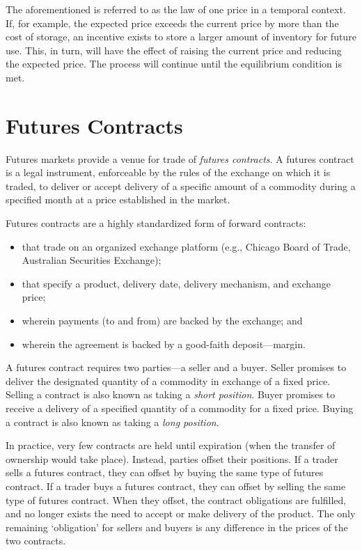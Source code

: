 \documentclass[
  oneside]{book}
\providecommand{\tightlist}{%
  \setlength{\itemsep}{0pt}\setlength{\parskip}{0pt}}
\begin{document}
The aforementioned is referred to as the law of one price in a temporal context. If, for example, the expected price exceeds the current price by more than the cost of storage, an incentive exists to store a larger amount of inventory for future use. This, in turn, will have the effect of raising the current price and reducing the expected price. The process will continue until the equilibrium condition is met.

\hypertarget{futures-contracts}{%
\section{Futures Contracts}\label{futures-contracts}}

Futures markets provide a venue for trade of \emph{futures contracts}. A futures contract is a legal instrument, enforceable by the rules of the exchange on which it is traded, to deliver or accept delivery of a specific amount of a commodity during a specified month at a price established in the market.

Futures contracts are a highly standardized form of forward contracts:

\begin{itemize}
\tightlist
\item
  that trade on an organized exchange platform (e.g., Chicago Board of Trade, Australian Securities Exchange);
\item
  that specify a product, delivery date, delivery mechanism, and exchange price;
\item
  wherein payments (to and from) are backed by the exchange; and
\item
  wherein the agreement is backed by a good-faith deposit---margin.
\end{itemize}

A futures contract requires two parties---a seller and a buyer. Seller promises to deliver the designated quantity of a commodity in exchange of a fixed price. Selling a contract is also known as taking a \emph{short position}. Buyer promises to receive a delivery of a specified quantity of a commodity for a fixed price. Buying a contract is also known as taking a \emph{long position}.

In practice, very few contracts are held until expiration (when the transfer of ownership would take place). Instead, parties offset their positions. If a trader sells a futures contract, they can offset by buying the same type of futures contract. If a trader buys a futures contract, they can offset by selling the same type of futures contract. When they offset, the contract obligations are fulfilled, and no longer exists the need to accept or make delivery of the product. The only remaining `obligation' for sellers and buyers is any difference in the prices of the two contracts.
\end{document}
